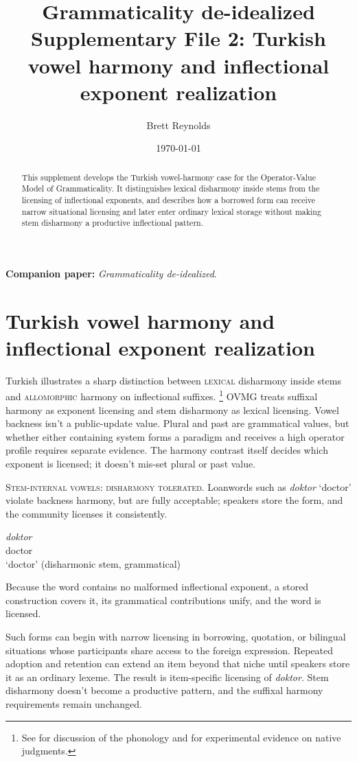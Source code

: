 \documentclass[12pt,letterpaper]{article}
\title{Grammaticality de-idealized\\[0.4em]
  \large Supplementary File 2: Turkish vowel harmony and
  inflectional exponent realization}
\author{}
\date{}
\author{Brett Reynolds}
\date{\today}
\newcommand{\term}[1]{\textsc{#1}}
\newcommand{\mention}[1]{\textit{#1}}
\begin{document}
\maketitle

\begin{abstract}
This supplement develops the Turkish vowel-harmony case for the Operator-Value
Model of Grammaticality. It distinguishes lexical disharmony inside stems from
the licensing of inflectional exponents, and describes how a borrowed form can
receive narrow situational licensing and later enter ordinary lexical storage without
making stem disharmony a productive inflectional pattern.
\end{abstract}

\noindent\textbf{Companion paper:} \emph{Grammaticality de-idealized}.

\section{Turkish vowel harmony and inflectional exponent realization}
\label{app:turkish-harmony}

Turkish illustrates a sharp distinction between \term{lexical} disharmony
inside stems and \term{allomorphic} harmony on inflectional suffixes.%
\footnote{See \autocite{Sezer1981,KabakVogel2001} for discussion of the
phonology and \autocite{Arik2015} for experimental evidence on native
judgments.}
OVMG treats suffixal harmony as exponent licensing and stem disharmony as
lexical licensing. Vowel backness isn't a public-update value. Plural and past
are grammatical values, but whether either containing system forms a paradigm
and receives a high operator profile requires separate evidence. The harmony
contrast itself decides which exponent is licensed;
it doesn't mis-set plural or past value.

\noindent\textsc{Stem-internal vowels: disharmony tolerated.} Loanwords such as
\mention{doktor} `doctor' violate backness harmony, but are fully acceptable;
speakers store the form, and the community licenses it consistently.

\ea \label{ex:doktor}
\gll \mention{doktor} \\
     doctor\\
\glt `doctor' (disharmonic stem, grammatical)
\z

Because the word contains no malformed inflectional exponent, a stored
construction covers it, its grammatical contributions unify, and the word is
licensed.

Such forms can begin with narrow licensing in borrowing, quotation, or
bilingual situations whose participants share access to the foreign
expression. Repeated adoption and retention can extend an item beyond that
niche until speakers store it as an ordinary lexeme. The result is
item-specific licensing of \mention{doktor}. Stem disharmony doesn't become a
productive pattern, and the suffixal harmony requirements remain unchanged.
\end{document}
